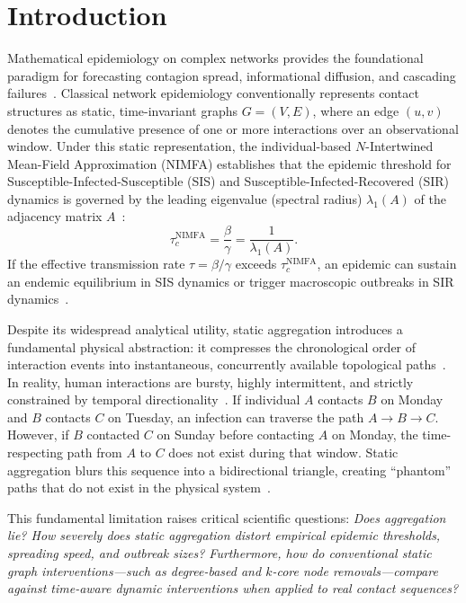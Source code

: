 \documentclass[conference]{IEEEtran}
\begin{document}
\section{Introduction}
Mathematical epidemiology on complex networks provides the foundational paradigm for forecasting contagion spread, informational diffusion, and cascading failures~\cite{pastorsatorras2001epidemic, vanmieghem2009virus}. Classical network epidemiology conventionally represents contact structures as static, time-invariant graphs $G = (V, E)$, where an edge $(u, v)$ denotes the cumulative presence of one or more interactions over an observational window. Under this static representation, the individual-based $N$-Intertwined Mean-Field Approximation (NIMFA) establishes that the epidemic threshold for Susceptible-Infected-Susceptible (SIS) and Susceptible-Infected-Recovered (SIR) dynamics is governed by the leading eigenvalue (spectral radius) $\lambda_1(A)$ of the adjacency matrix $A$~\cite{vanmieghem2009virus, chakrabarti2008epidemic}:
\begin{equation}
\tau_c^{\text{NIMFA}} = \frac{\beta}{\gamma} = \frac{1}{\lambda_1(A)}.
\label{eq:nimfa}
\end{equation}
If the effective transmission rate $\tau = \beta/\gamma$ exceeds $\tau_c^{\text{NIMFA}}$, an epidemic can sustain an endemic equilibrium in SIS dynamics or trigger macroscopic outbreaks in SIR dynamics~\cite{chakrabarti2008epidemic}.

Despite its widespread analytical utility, static aggregation introduces a fundamental physical abstraction: it compresses the chronological order of interaction events into instantaneous, concurrently available topological paths~\cite{holme2012temporal}. In reality, human interactions are bursty, highly intermittent, and strictly constrained by temporal directionality~\cite{karsai2011small, perra2012activity}. If individual $A$ contacts $B$ on Monday and $B$ contacts $C$ on Tuesday, an infection can traverse the path $A \to B \to C$. However, if $B$ contacted $C$ on Sunday before contacting $A$ on Monday, the time-respecting path from $A$ to $C$ does not exist during that window. Static aggregation blurs this sequence into a bidirectional triangle, creating ``phantom'' paths that do not exist in the physical system~\cite{valdano2015analytical}.

This fundamental limitation raises critical scientific questions: \textit{Does aggregation lie? How severely does static aggregation distort empirical epidemic thresholds, spreading speed, and outbreak sizes? Furthermore, how do conventional static graph interventions—such as degree-based and $k$-core node removals—compare against time-aware dynamic interventions when applied to real contact sequences?}
\end{document}
